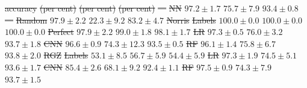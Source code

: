 \documentclass[11pt, a4paper]{book}
\providecommand{\DIFdeltex}[1]{{\protect\color{red}\sout{#1}}}                      %
\providecommand{\DIFdelFL}[1]{\DIFdel{#1}} %
\providecommand{\DIFdel}[1]{\texorpdfstring{\DIFdeltex{#1}}{}} %
\begin{document}
\DIFdelFL{accuracy}%
\DIFdelFL{(per cent) }%
\DIFdelFL{(per cent) }%
\DIFdelFL{(per cent)}%
\DIFdelFL{---}%
\DIFdelFL{NN }%
\DIFdelFL{$97.2 \pm 1.7$ }%
\DIFdelFL{$75.7 \pm 7.9$ }%
\DIFdelFL{$93.4 \pm 0.8$}%
\DIFdelFL{---}%
\DIFdelFL{Random }%
\DIFdelFL{$97.9 \pm 2.2$ }%
\DIFdelFL{$22.3 \pm 9.2$ }%
\DIFdelFL{$83.2 \pm 4.7$}%
\DIFdelFL{Norris }%
\DIFdelFL{Labels }%
\DIFdelFL{$100.0 \pm 0.0$ }%
\DIFdelFL{$100.0 \pm 0.0$ }%
\DIFdelFL{$100.0 \pm 0.0$}%
\DIFdelFL{Perfect }%
\DIFdelFL{$97.9 \pm 2.2$ }%
\DIFdelFL{$99.0 \pm 1.8$ }%
\DIFdelFL{$98.1 \pm 1.7$}%
\DIFdelFL{LR }%
\DIFdelFL{$97.3 \pm 0.5$ }%
\DIFdelFL{$76.0 \pm 3.2$ }%
\DIFdelFL{$93.7 \pm 1.8$}%
\DIFdelFL{CNN }%
\DIFdelFL{$96.6 \pm 0.9$ }%
\DIFdelFL{$74.3 \pm 12.3$ }%
\DIFdelFL{$93.5 \pm 0.5$}%
\DIFdelFL{RF }%
\DIFdelFL{$96.1 \pm 1.4$ }%
\DIFdelFL{$75.8 \pm 6.7$ }%
\DIFdelFL{$93.8 \pm 2.0$}%
\DIFdelFL{RGZ }%
\DIFdelFL{Labels }%
\DIFdelFL{$53.1 \pm 8.5$ }%
\DIFdelFL{$56.7 \pm 5.9$ }%
\DIFdelFL{$54.4 \pm 5.9$}%
\DIFdelFL{LR }%
\DIFdelFL{$97.3 \pm 1.9$ }%
\DIFdelFL{$74.5 \pm 5.1$ }%
\DIFdelFL{$93.6 \pm 1.7$}%
\DIFdelFL{CNN }%
\DIFdelFL{$85.4 \pm 2.6$ }%
\DIFdelFL{$68.1 \pm 9.2$ }%
\DIFdelFL{$92.4 \pm 1.1$}%
\DIFdelFL{RF }%
\DIFdelFL{$97.5 \pm 0.9$ }%
\DIFdelFL{$74.3 \pm 7.9$ }%
\DIFdelFL{$93.7 \pm 1.5$}%
\end{document}
